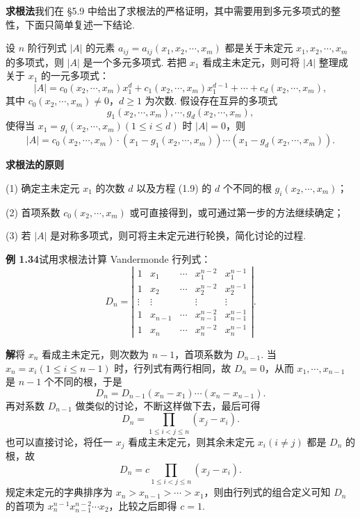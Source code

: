 \documentclass[UTF8,12pt,a4paper,fontset=fandol]{ctexart}
\begin{document}
\noindent\textbf{求根法}\quad 我们在 §5.9 中给出了求根法的严格证明，其中需要用到多元多项式的整性，下面只简单复述一下结论.

设 $n$ 阶行列式 $|A|$ 的元素 $a_{ij}=a_{ij}(x_1,x_2,\cdots,x_m)$ 都是关于未定元 $x_1,x_2,\cdots,x_m$ 的多项式，则 $|A|$ 是一个多元多项式. 若把 $x_1$ 看成主未定元，则可将 $|A|$ 整理成关于 $x_1$ 的一元多项式：
\begin{equation}
|A|=c_0(x_2,\cdots,x_m)x_1^d+c_1(x_2,\cdots,x_m)x_1^{d-1}
+\cdots+c_d(x_2,\cdots,x_m),
\tag{1.9}
\end{equation}
其中 $c_0(x_2,\cdots,x_m)\ne0$，$d\ge1$ 为次数. 假设存在互异的多项式
\[
g_1(x_2,\cdots,x_m),\cdots,g_d(x_2,\cdots,x_m),
\]
使得当 $x_1=g_i(x_2,\cdots,x_m)(1\le i\le d)$ 时 $|A|=0$，则
\[
|A|=c_0(x_2,\cdots,x_m)\cdot(x_1-g_1(x_2,\cdots,x_m))\cdots
(x_1-g_d(x_2,\cdots,x_m)).
\]

\noindent\textbf{求根法的原则}

(1) 确定主未定元 $x_1$ 的次数 $d$ 以及方程 (1.9) 的 $d$ 个不同的根 $g_i(x_2,\cdots,x_m)$；

(2) 首项系数 $c_0(x_2,\cdots,x_m)$ 或可直接得到，或可通过第一步的方法继续确定；

(3) 若 $|A|$ 是对称多项式，则可将主未定元进行轮换，简化讨论的过程.

\noindent\textbf{例 1.34}\quad 试用求根法计算 Vandermonde 行列式：
\[
D_n=\left|\begin{array}{ccccc}
1 & x_1 & \cdots & x_1^{n-2} & x_1^{n-1}\\
1 & x_2 & \cdots & x_2^{n-2} & x_2^{n-1}\\
\vdots & \vdots &        & \vdots & \vdots\\
1 & x_{n-1} & \cdots & x_{n-1}^{n-2} & x_{n-1}^{n-1}\\
1 & x_n & \cdots & x_n^{n-2} & x_n^{n-1}
\end{array}\right|.
\]

\noindent\textbf{解}\quad 将 $x_n$ 看成主未定元，则次数为 $n-1$，首项系数为 $D_{n-1}$. 当 $x_n=x_i(1\le i\le n-1)$ 时，行列式有两行相同，故 $D_n=0$，从而 $x_1,\cdots,x_{n-1}$ 是 $n-1$ 个不同的根，于是
\[
D_n=D_{n-1}(x_n-x_1)\cdots(x_n-x_{n-1}).
\]
再对系数 $D_{n-1}$ 做类似的讨论，不断这样做下去，最后可得
\[
D_n=\prod_{1\le i<j\le n}(x_j-x_i).
\]
也可以直接讨论，将任一 $x_j$ 看成主未定元，则其余未定元 $x_i(i\ne j)$ 都是 $D_n$ 的根，故
\[
D_n=c\prod_{1\le i<j\le n}(x_j-x_i).
\]
规定未定元的字典排序为 $x_n>x_{n-1}>\cdots>x_1$，则由行列式的组合定义可知 $D_n$ 的首项为 $x_n^{n-1}x_{n-1}^{n-2}\cdots x_2$，比较之后即得 $c=1$.
\end{document}
